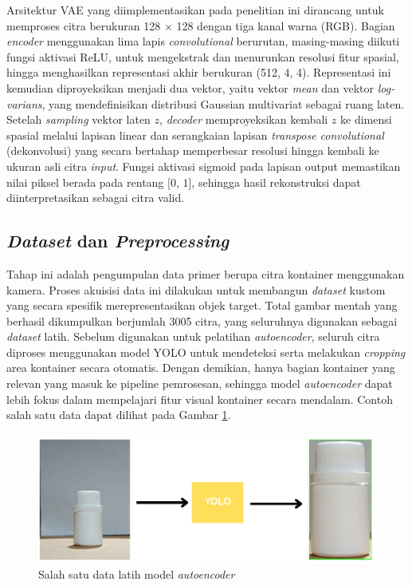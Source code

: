 Arsitektur VAE yang diimplementasikan pada penelitian ini dirancang
untuk memproses citra berukuran 128 $\times$ 128 dengan tiga kanal
warna (RGB). Bagian \textit{encoder} menggunakan lima lapis
\textit{convolutional} berurutan, masing-masing diikuti fungsi
aktivasi ReLU, untuk mengekstrak dan menurunkan
resolusi fitur spasial, hingga menghasilkan representasi akhir
berukuran (512, 4, 4). Representasi ini kemudian diproyeksikan
menjadi dua vektor, yaitu vektor
\textit{mean} dan vektor \textit{log-varians}, yang mendefinisikan
distribusi Gaussian
multivariat sebagai ruang laten. Setelah \textit{sampling} vektor laten $z$,
\textit{decoder} memproyeksikan kembali $z$ ke dimensi spasial melalui lapisan
linear dan serangkaian lapisan \textit{transpose convolutional}
(dekonvolusi) yang secara bertahap memperbesar resolusi hingga
kembali ke ukuran asli citra \textit{input}. Fungsi aktivasi sigmoid pada
lapisan output memastikan nilai piksel berada pada rentang $\text{[0, 1]}$,
sehingga hasil rekonstruksi dapat diinterpretasikan sebagai citra valid.

\vspace{1em}

\subsection{\textit{Dataset} dan \textit{Preprocessing}}
Tahap ini adalah pengumpulan data primer berupa
citra kontainer menggunakan kamera. Proses akuisisi data ini
dilakukan untuk membangun \textit{dataset} kustom yang secara spesifik
merepresentasikan objek target. Total gambar mentah yang berhasil
dikumpulkan berjumlah 3005 citra, yang seluruhnya digunakan sebagai
\textit{dataset} latih. Sebelum digunakan untuk pelatihan
\textit{autoencoder}, seluruh
citra diproses menggunakan model YOLO untuk mendeteksi serta
melakukan \textit{cropping} area kontainer
secara otomatis. Dengan demikian, hanya bagian kontainer yang relevan
yang masuk ke pipeline pemrosesan, sehingga model \textit{autoencoder} dapat
lebih fokus dalam mempelajari fitur visual kontainer secara mendalam.
Contoh salah satu data dapat dilihat pada Gambar \ref{fig:ae-data}.

\begin{figure}[H]
  \centering
  \includegraphics[width=\textwidth]{gambar/ae_data.png}
  \caption{Salah satu data latih model \textit{autoencoder}}
  \label{fig:ae-data}
\end{figure}
\vspace{-1em}

